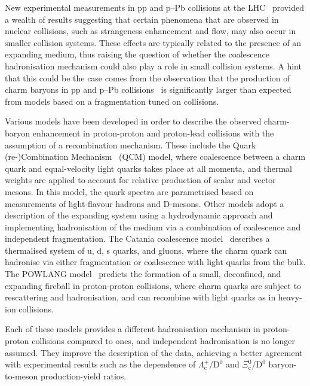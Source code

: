 New experimental measurements in pp and p--Pb collisions at the LHC~\cite{ALICE:2024ozd,ALICE:2016fzo,ALICE:2020wla,ALICE:2020wfu,ALICE:2021bli,CMS:2015fgy} provided a wealth of results suggesting that certain phenomena that are observed in nuclear collisions, such as strangeness enhancement and flow, may also occur in smaller collision systems. These effects are typically related to the presence of an expanding medium, thus raising the question of whether the coalescence hadronisation mechanism could also play a role in small collision systems. A hint that this could be the case comes from the observation that the production of charm baryons in pp and p--Pb collisions~\cite{ALICE:2022exq,ALICE:2024ozd} is significantly larger than expected from models based on a fragmentation tuned on \ee collisions. 

Various models have been developed in order to describe the observed charm-baryon enhancement in proton-proton and proton-lead collisions with the assumption of a recombination mechanism. These include the Quark (re-)Combination Mechanism~\cite{Song:2018tpv} (QCM) model, where coalescence between a charm quark and equal-velocity light quarks takes place at all momenta, and thermal weights are applied to account for relative production of scalar and vector mesons. In this model, the quark spectra are parametrised based on measurements of light-flavour hadrons and D-mesons. Other models adopt a description of the expanding system using a hydrodynamic approach and implementing hadronisation of the medium via a combination of coalescence and independent fragmentation. The Catania coalescence model~\cite{Minissale:2020bif} describes a thermalised system of u, d, s quarks, and gluons, where the charm quark can hadronise via either fragmentation or coalescence with light quarks from the bulk. The POWLANG model~\cite{Beraudo:2023nlq} predicts the formation of a small, deconfined, and expanding fireball in proton-proton collisions, where charm quarks are subject to rescattering and hadronisation, and can recombine with light quarks as in heavy-ion collisions. 

Each of these models provides a different hadronisation mechanism in proton-proton collisions compared to \ee ones, and independent hadronisation is no longer assumed. They improve the description of the data, achieving a better agreement with experimental results such as the \pt dependence of $\Lambda_\mathrm{c}^+/\mathrm{D}^0$ and $\Xi_\mathrm{c}^0/\mathrm{D}^0$ baryon-to-meson production-yield ratios.

